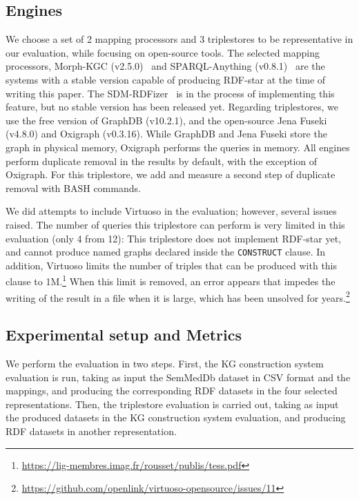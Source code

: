 \subsection{Engines}
\label{sec:chp6-1_engines}
We choose a set of 2 mapping processors and 3 triplestores to be representative in our evaluation, while focusing on open-source tools. The selected mapping processors, Morph-KGC (v2.5.0)~\citep{arenas2022morphkgc} and SPARQL-Anything (v0.8.1)~\citep{asprino2023sparql-anything} are the systems with a stable version capable of producing RDF-star at the time of writing this paper. The SDM-RDFizer~\citep{iglesias2020rdfizer} is in the process of implementing this feature, but no stable version has been released yet. Regarding triplestores, we use the free version of GraphDB (v10.2.1), and the open-source Jena Fuseki (v4.8.0) and Oxigraph (v0.3.16). While GraphDB and Jena Fuseki store the graph in physical memory, Oxigraph performs the queries in memory. All engines perform duplicate removal in the results by default, with the exception of Oxigraph. For this triplestore, we add and measure a second step of duplicate removal with BASH commands.


We did attempts to include Virtuoso in the evaluation; however, several issues raised. The number of queries this triplestore can perform is very limited in this evaluation (only 4 from 12): This triplestore
does not implement RDF-star yet, and cannot produce named graphs declared inside the \texttt{CONSTRUCT} clause. In addition, Virtuoso limits the number of triples that can be produced with this clause to 1M.\footnote{\url{https://lig-membres.imag.fr/rousset/publis/tess.pdf}} When this limit is removed, an error appears that impedes the writing of the result in a file when it is large, which has been unsolved for years.\footnote{\url{https://github.com/openlink/virtuoso-opensource/issues/11}} 




\subsection{Experimental setup and Metrics}
\label{sec:chp6-1_exp-setup}
We perform the evaluation in two steps. First, the KG construction system evaluation is run, taking as input the SemMedDb dataset in CSV format and the mappings, and producing the corresponding RDF datasets in the four selected representations. Then, the triplestore evaluation is carried out, taking as input the produced datasets in the KG construction system evaluation, and producing RDF datasets in another representation.


